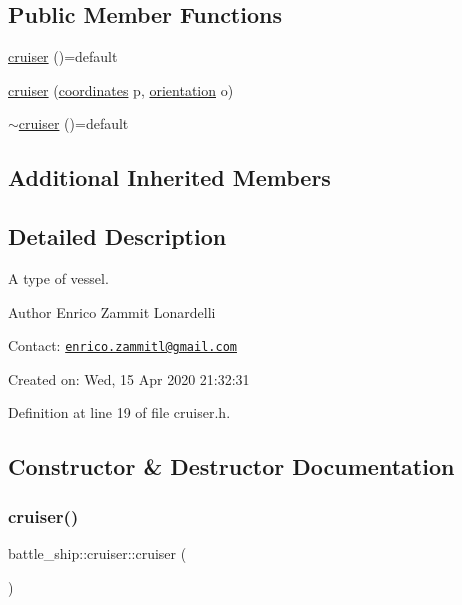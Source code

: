 \subsection*{Public Member Functions}
\begin{DoxyCompactItemize}
\item 
\hyperlink{classbattle__ship_1_1cruiser_aa8fad74fb5caf3fd0cec5429b97fb46a}{cruiser} ()=default
\item 
\hyperlink{classbattle__ship_1_1cruiser_a3460b4b49152a6653122e30224114115}{cruiser} (\hyperlink{structbattle__ship_1_1coordinates}{coordinates} p, \hyperlink{namespacebattle__ship_aed87488f0a73f0d0679fe343fb61c784}{orientation} o)
\item 
\hyperlink{classbattle__ship_1_1cruiser_a78e3074b6331c963a2ba3200a14a85c3}{$\sim$cruiser} ()=default
\end{DoxyCompactItemize}
\subsection*{Additional Inherited Members}


\subsection{Detailed Description}
A type of vessel. 

\begin{DoxyAuthor}{Author}
Enrico Zammit Lonardelli
\end{DoxyAuthor}
Contact\+: \href{mailto:enrico.zammitl@gmail.com}{\tt enrico.\+zammitl@gmail.\+com}

Created on\+: Wed, 15 Apr 2020 21\+:32\+:31 

Definition at line 19 of file cruiser.\+h.



\subsection{Constructor \& Destructor Documentation}
\mbox{\label{classbattle__ship_1_1cruiser_aa8fad74fb5caf3fd0cec5429b97fb46a}} 
\subsubsection{\texorpdfstring{cruiser()}{cruiser()}\hspace{0.1cm}{\footnotesize\ttfamily [1/2]}}
{\footnotesize\ttfamily battle\+\_\+ship\+::cruiser\+::cruiser (\begin{DoxyParamCaption}{ }\end{DoxyParamCaption})\hspace{0.3cm}{\ttfamily [default]}}


